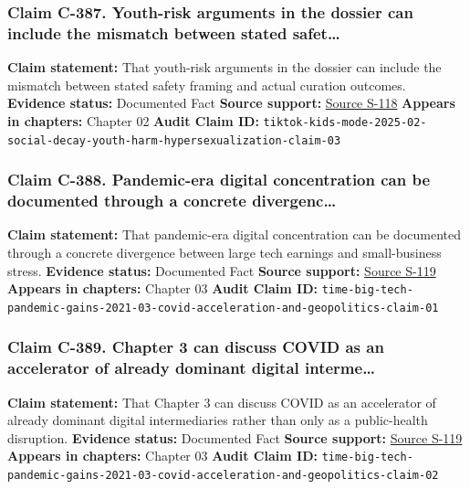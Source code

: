 \documentclass[
  american,
  11pt,
  letterpaper,
]{article}
\begin{document}
\subsubsection{Claim C-387. Youth-risk arguments in the dossier can
include the mismatch between stated
safet\ldots{}}\label{claim-c-387-youth-risk-arguments-in-the-dossier-can-include-the-mismatch-between-stated-safet}

\textbf{Claim statement:} That youth-risk arguments in the dossier can
include the mismatch between stated safety framing and actual curation
outcomes. \textbf{Evidence status:} Documented Fact \textbf{Source
support:}
\hyperref[source-s-118-when-kids-mode-isn-t-for-kids-investigating-tiktok-s-under-13-experience]{Source
S-118} \textbf{Appears in chapters:} Chapter 02 \textbf{Audit Claim ID:}
\texttt{tiktok-kids-mode-2025-02-social-decay-youth-harm-hypersexualization-claim-03}

\subsubsection{Claim C-388. Pandemic-era digital concentration can be
documented through a concrete
divergenc\ldots{}}\label{claim-c-388-pandemic-era-digital-concentration-can-be-documented-through-a-concrete-divergenc}

\textbf{Claim statement:} That pandemic-era digital concentration can be
documented through a concrete divergence between large tech earnings and
small-business stress. \textbf{Evidence status:} Documented Fact
\textbf{Source support:}
\hyperref[source-s-119-big-tech-announces-striking-pandemic-gains-as-small-businesses-strain-to-find-their-footing]{Source
S-119} \textbf{Appears in chapters:} Chapter 03 \textbf{Audit Claim ID:}
\texttt{time-big-tech-pandemic-gains-2021-03-covid-acceleration-and-geopolitics-claim-01}

\subsubsection{Claim C-389. Chapter 3 can discuss COVID as an
accelerator of already dominant digital
interme\ldots{}}\label{claim-c-389-chapter-3-can-discuss-covid-as-an-accelerator-of-already-dominant-digital-interme}

\textbf{Claim statement:} That Chapter 3 can discuss COVID as an
accelerator of already dominant digital intermediaries rather than only
as a public-health disruption. \textbf{Evidence status:} Documented Fact
\textbf{Source support:}
\hyperref[source-s-119-big-tech-announces-striking-pandemic-gains-as-small-businesses-strain-to-find-their-footing]{Source
S-119} \textbf{Appears in chapters:} Chapter 03 \textbf{Audit Claim ID:}
\texttt{time-big-tech-pandemic-gains-2021-03-covid-acceleration-and-geopolitics-claim-02}
\end{document}
